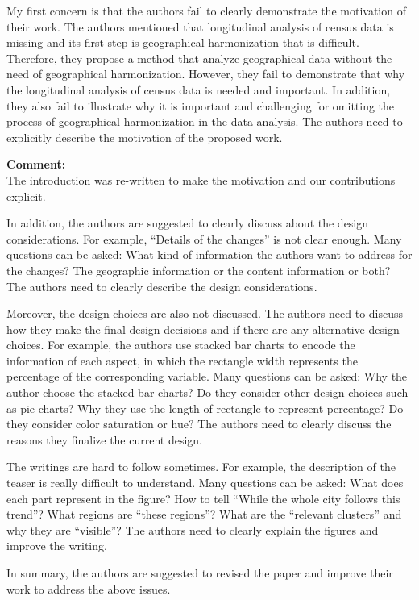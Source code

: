 \documentclass{article}
\newcommand{\reply}[1]{\begin{tcolorbox}\noindent\textbf{Comment:}\\#1\hfill\end{tcolorbox}}
\begin{document}
\begin{itemize}
{    My first concern is that the authors fail to clearly demonstrate the motivation of
    their work. The authors mentioned that longitudinal analysis of census data is
    missing and its first step is geographical harmonization that is difficult.
    Therefore, they propose a method that analyze geographical data without the need
    of geographical harmonization. However, they fail to demonstrate that why the
    longitudinal analysis of census data is needed and important. In addition, they
    also fail to illustrate why it is important and challenging for omitting the
    process of geographical harmonization in the data analysis. The authors need to
    explicitly describe the motivation of the proposed work.

    \reply{The introduction was re-written to make the motivation and our contributions explicit.}

    In addition, the authors are suggested to clearly discuss about the design
    considerations. For example, “Details of the changes” is not clear enough. Many
    questions can be asked: What kind of information the authors want to address for
    the changes? The geographic information or the content information or both? The
    authors need to clearly describe the design considerations.

    Moreover, the design choices are also not discussed. The authors need to discuss
    how they make the final design decisions and if there are any alternative design
    choices. For example, the authors use stacked bar charts to encode the information
    of each aspect, in which the rectangle width represents the percentage of the
    corresponding variable. Many questions can be asked: Why the author choose the
    stacked bar charts? Do they consider other design choices such as pie charts? Why
    they use the length of rectangle to represent percentage? Do they consider color
    saturation or hue? The authors need to clearly discuss the reasons they finalize
    the current design.

    The writings are hard to follow sometimes. For example, the description of the
    teaser is really difficult to understand. Many questions can be asked: What does
    each part represent in the figure? How to tell “While the whole city follows this
    trend”? What regions are “these regions”? What are the “relevant clusters” and why
    they are “visible”? The authors need to clearly explain the figures and improve
    the writing.

    In summary, the authors are suggested to revised the paper and improve their work
    to address the above issues.
}
\end{itemize}
\end{document}
